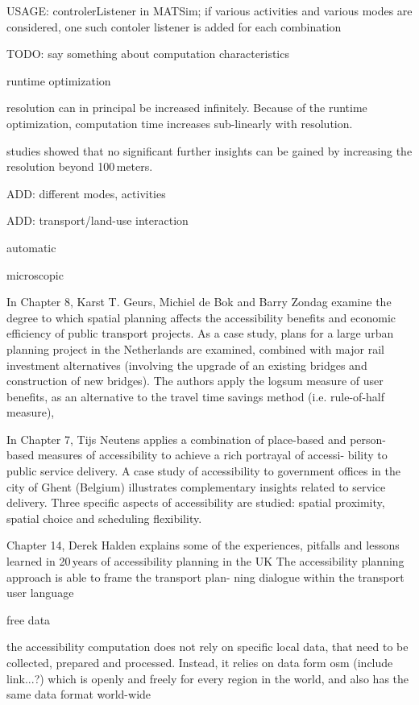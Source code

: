 USAGE: controlerListener in MATSim; if various activities and various modes are considered, one such contoler listener is added for each combination


TODO: say something about computation characteristics

runtime optimization

resolution can in principal be increased infinitely. Because of the runtime optimization, computation time increases sub-linearly with resolution.

studies showed that no significant further insights can be gained by increasing the resolution beyond 100\,meters.

ADD: different modes, activities

ADD: transport/land-use interaction

automatic

microscopic


In Chapter 8, Karst T. Geurs, Michiel de Bok and Barry Zondag examine the degree to which spatial planning affects the accessibility benefits and economic efficiency of public transport projects. As a case study, plans for a large urban planning project in the Netherlands are examined, combined with major rail investment alternatives (involving the upgrade of an existing bridges and construction of new bridges). The authors apply the logsum measure of user benefits, as an alternative to the travel time savings method (i.e. rule-of-half measure),

In Chapter 7, Tijs Neutens applies a combination of place-based and person-based measures of accessibility to achieve a rich portrayal of accessi- bility to public service delivery. A case study of accessibility to government offices in the city of Ghent (Belgium) illustrates complementary insights related to service delivery. Three specific aspects of accessibility are studied: spatial proximity, spatial choice and scheduling flexibility.

Chapter 14, Derek Halden explains some of the experiences, pitfalls and lessons learned in 20\,years of accessibility planning in the UK
The accessibility planning approach is able to frame the transport plan- ning dialogue within the transport user language 

free data

the accessibility computation does not rely on specific local data, that need to be collected, prepared and processed. Instead, it relies on data form \gls{osm} (include link...?) which is openly and freely for every region in the world, and also has the same data format world-wide

